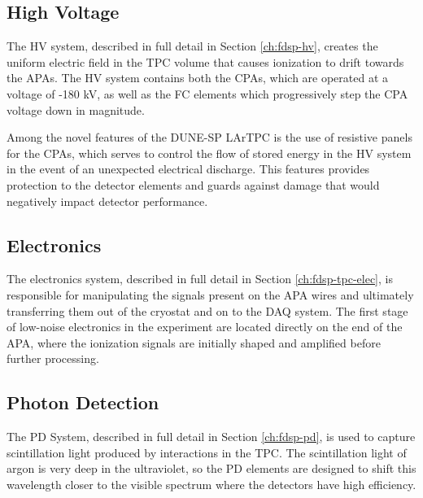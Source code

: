 \subsection{High Voltage}
\label{sec:fdsp-ov-hv}

The HV system, described in full detail in Section \ref{ch:fdsp-hv}, creates the uniform electric field in the TPC volume that causes ionization to drift towards the APAs.  The HV system contains both the CPAs, which are operated at a voltage of -180 kV, as well as the FC elements which progressively step the CPA voltage down in magnitude.  

Among the novel features of the DUNE-SP LArTPC is the use of resistive panels for the CPAs, which serves to control the flow of stored energy in the HV system in the event of an unexpected electrical discharge.  This features provides protection to the detector elements and guards against damage that would negatively impact detector performance.  



\subsection{Electronics}
\label{sec:fdsp-ov-elec}

The electronics system, described in full detail in Section \ref{ch:fdsp-tpc-elec}, is responsible for manipulating the signals present on the APA wires and ultimately transferring them out of the cryostat and on to the DAQ system.  The first stage of low-noise electronics in the experiment are located directly on the end of the APA, where the ionization signals are initially shaped and amplified before further processing. 


\subsection{Photon Detection}
\label{sec:fdsp-ov-pds}

The PD System, described in full detail in Section \ref{ch:fdsp-pd}, is used to capture scintillation light produced by interactions in the TPC.  The scintillation light of argon is very deep in the ultraviolet, so the PD elements are designed to shift this wavelength closer to the visible spectrum where the detectors have high efficiency.  


